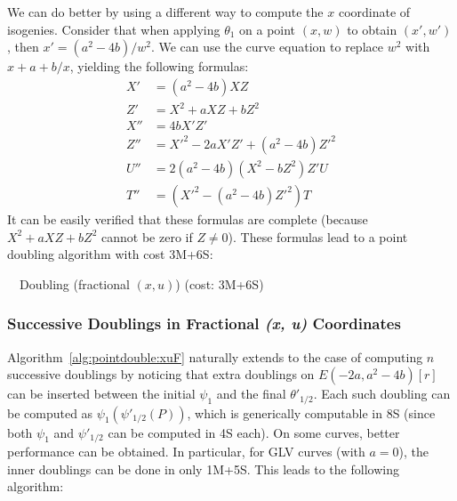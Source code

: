 \documentclass{llncs}
\begin{document}
We can do better by using a different way to compute the $x$ coordinate
of isogenies. Consider that when applying $\theta_1$ on a point $(x, w)$
to obtain $(x', w')$, then $x' = (a^2-4b)/w^2$. We can use the curve
equation to replace $w^2$ with $x + a + b/x$, yielding the following
formulas:
\begin{align*}
    X' &= (a^2-4b) XZ \\
    Z' &= X^2 + aXZ + bZ^2 \\
    X'' &= 4b X'Z' \\
    Z'' &= X'^2 - 2a X'Z' + (a^2-4b) Z'^2 \\
    U'' &= 2(a^2 - 4b) (X^2 - bZ^2) Z'U \\
    T'' &= (X'^2 - (a^2 - 4b)Z'^2) T
\end{align*}
It can be easily verified that these formulas are complete (because
$X^2 + aXZ + bZ^2$ cannot be zero if $Z\neq 0$). These formulas lead
to a point doubling algorithm with cost 3M+6S:

\begin{algorithm}[H]
    \caption{\ \ Doubling (fractional $(x,u)$) (cost: 3M+6S)}\label{alg:pointdouble:xuFalt}
    \begin{algorithmic}[1]
    \end{algorithmic}
\end{algorithm}

\subsubsection{Successive Doublings in Fractional \emph{(x, u)} Coordinates}\label{sec:algorithms:xuF:xdbl}

Algorithm~\ref{alg:pointdouble:xuF} naturally extends to the case of
computing $n$ successive doublings by noticing that extra doublings on
$E(-2a,a^2-4b)[r]$ can be inserted between the initial $\psi_1$ and
the final $\theta'_{1/2}$. Each such doubling can be computed as
$\psi_1(\psi'_{1/2}(P))$, which is generically computable in 8S (since
both $\psi_1$ and $\psi'_{1/2}$ can be computed in 4S each). On some
curves, better performance can be obtained. In particular, for GLV
curves (with $a = 0$), the inner doublings can be done in only 1M+5S.
This leads to the following algorithm:
\end{document}
